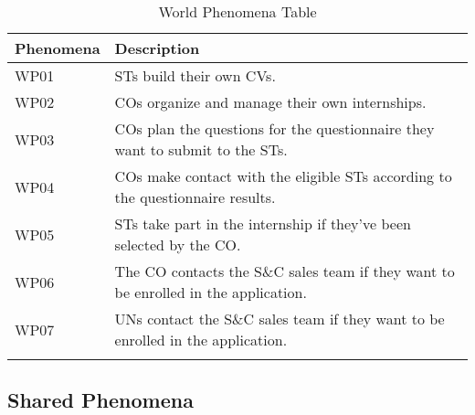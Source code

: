 \begin{longtable}{|l|p{}|}
    \hline
    \textbf{Phenomena} & \textbf{Description}                                                                \\
    \hline \hline
    WP01               & STs build their own CVs.                                                            \\
    \hline
    WP02               & COs organize and manage their own internships.                                      \\
    \hline
    WP03               & COs plan the questions for the questionnaire they want to submit to the STs.        \\
    \hline
    WP04               & COs make contact with the eligible STs according to the questionnaire results.      \\
    \hline
    WP05               & STs take part in the internship if they've been selected by the CO.                 \\
    \hline
    WP06               & The CO contacts the S\&C sales team if they want to be enrolled in the application. \\
    \hline
    WP07               & UNs contact the S\&C sales team if they want to be enrolled in the application.     \\
    \hline
    \caption{World Phenomena Table}
    \label{tab:world-phenomena}
\end{longtable}

\pagebreak

\subsection{Shared Phenomena}
\label{subsec:shared-phenomena}%

